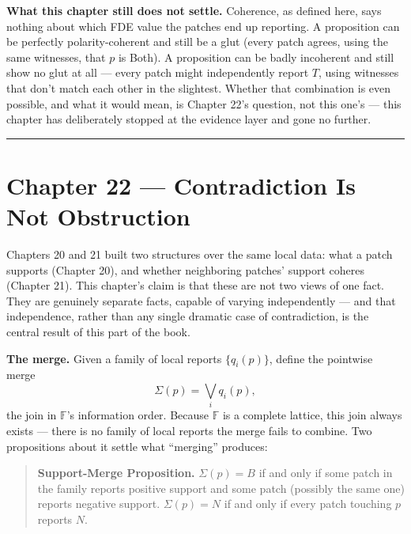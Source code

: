 \textbf{What this chapter still does not settle.} Coherence, as defined here,
says nothing about which FDE value the patches end up reporting. A
proposition can be perfectly polarity-coherent and still be a glut (every
patch agrees, using the same witnesses, that \(p\) is Both). A proposition
can be badly incoherent and still show no glut at all --- every patch might
independently report \(T\), using witnesses that don't match each other in
the slightest. Whether that combination is even possible, and what it
would mean, is Chapter 22's question, not this one's --- this chapter has
deliberately stopped at the evidence layer and gone no further.

\begin{center}\rule{0.5\linewidth}{0.5pt}\end{center}

\hypertarget{chapter-22-contradiction-is-not-obstruction}{%
\chapter*{Chapter 22 --- Contradiction Is Not Obstruction}
\label{chapter-22-contradiction-is-not-obstruction}}

Chapters 20 and 21 built two structures over the same local data: what a
patch supports (Chapter 20), and whether neighboring patches' support
coheres (Chapter 21). This chapter's claim is that these are not two
views of one fact. They are genuinely separate facts, capable of varying
independently --- and that independence, rather than any single dramatic
case of contradiction, is the central result of this part of the book.

\textbf{The merge.} Given a family of local reports \(\{q_i(p)\}\), define the
pointwise merge
\[\Sigma(p) = \bigvee_i q_i(p),\]
the join in \(\mathbb{F}\)'s information order. Because \(\mathbb{F}\) is a
complete lattice, this join always exists --- there is no family of local
reports the merge fails to combine. Two propositions about it settle what
``merging'' produces:

\begin{quote}
\textbf{Support-Merge Proposition.} \(\Sigma(p) = B\) if and only if some
patch in the family reports positive support and some patch (possibly
the same one) reports negative support. \(\Sigma(p) = N\) if and only if
every patch touching \(p\) reports \(N\).
\end{quote}

